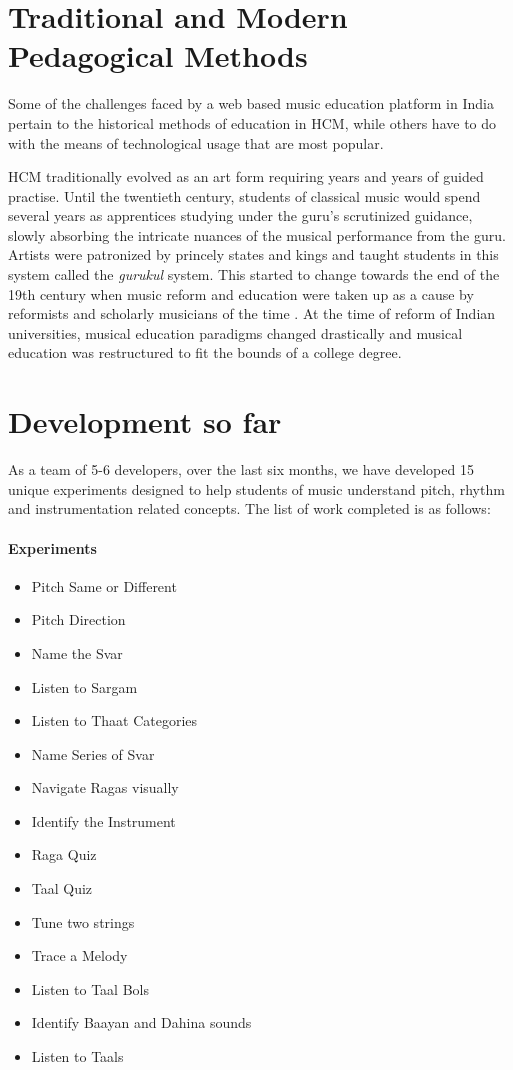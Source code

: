 \documentclass{tufte-handout}
\begin{document}
\section{Traditional and Modern Pedagogical Methods}
Some of the challenges faced by a web based music education platform in India pertain to the historical methods of education in HCM, while others have to do with the means of technological usage that are most popular. 

HCM traditionally evolved as an art form requiring years and years of guided practise. Until the twentieth century, students of classical music would spend several years as apprentices studying under the guru's scrutinized guidance, slowly absorbing the intricate nuances of the musical performance from the guru. \cite{neuman} Artists were patronized by princely states and kings and taught students in this system called the \textit{gurukul} system. This started to change towards the end of the 19th century when music reform and education were taken up as a cause by reformists and scholarly musicians of the time \cite{newmansions}. At the time of reform of Indian universities, musical education paradigms changed drastically and musical education was restructured to fit the bounds of a college degree. 



\section{Development so far}
As a team of 5-6 developers, over the last six months, we have developed 15 unique experiments designed to help students of music understand pitch, rhythm and instrumentation related concepts. The list of work completed is as follows:
\paragraph{Experiments}
\begin{itemize}
\item Pitch Same or Different
\item Pitch Direction
\item Name the Svar
\item Listen to Sargam
\item Listen to Thaat Categories
\item Name Series of Svar
\item Navigate Ragas visually
\item Identify the Instrument
\item Raga Quiz
\item Taal Quiz
\item Tune two strings
\item Trace a Melody
\item Listen to Taal Bols
\item Identify Baayan and Dahina sounds
\item Listen to Taals
\end{itemize}
\end{document}
